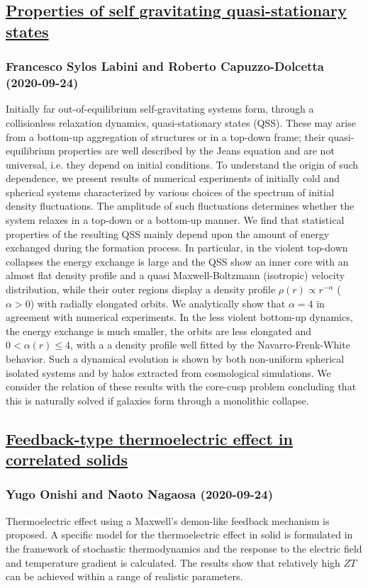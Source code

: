 \subsection*{\href{http://arxiv.org/abs/2009.11624v1}{Properties of self gravitating quasi-stationary states}}
\subsubsection*{Francesco Sylos Labini and Roberto Capuzzo-Dolcetta (2020-09-24)}
Initially far out-of-equilibrium self-gravitating systems form, through a
collisionless relaxation dynamics, quasi-stationary states (QSS). These may
arise from a bottom-up aggregation of structures or in a top-down frame; their
quasi-equilibrium properties are well described by the Jeans equation and are
not universal, i.e. they depend on initial conditions. To understand the origin
of such dependence, we present results of numerical experiments of initially
cold and spherical systems characterized by various choices of the spectrum of
initial density fluctuations. The amplitude of such fluctuations determines
whether the system relaxes in a top-down or a bottom-up manner. We find that
statistical properties of the resulting QSS mainly depend upon the amount of
energy exchanged during the formation process. In particular, in the violent
top-down collapses the energy exchange is large and the QSS show an inner core
with an almost flat density profile and a quasi Maxwell-Boltzmann (isotropic)
velocity distribution, while their outer regions display a density profile
$\rho(r) \propto r^{-\alpha}$ ($\alpha >0$) with radially elongated orbits. We
analytically show that $\alpha=4$ in agreement with numerical experiments. In
the less violent bottom-up dynamics, the energy exchange is much smaller, the
orbits are less elongated and $0< \alpha(r) \le 4$, with a a density profile
well fitted by the Navarro-Frenk-White behavior. Such a dynamical evolution is
shown by both non-uniform spherical isolated systems and by halos extracted
from cosmological simulations. We consider the relation of these results with
the core-cusp problem concluding that this is naturally solved if galaxies form
through a monolithic collapse.

\subsection*{\href{http://arxiv.org/abs/2009.11594v1}{Feedback-type thermoelectric effect in correlated solids}}
\subsubsection*{Yugo Onishi and Naoto Nagaosa (2020-09-24)}
Thermoelectric effect using a Maxwell's demon-like feedback mechanism is
proposed. A specific model for the thermoelectric effect in solid is formulated
in the framework of stochastic thermodynamics and the response to the electric
field and temperature gradient is calculated. The results show that relatively
high $ZT$ can be achieved within a range of realistic parameters.

